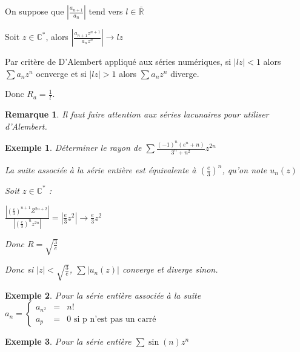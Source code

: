 \documentclass[a4paper,12pt]{book}
\newcommand{\Pre}[1]{\begin{tcolorbox}[sharp corners, colback=white,colframe=green!60!green!30!black!75, title=Preuve]#1\end{tcolorbox}}
\newtheorem{Exe}{Exemple}[section]
\newtheorem{Rem}{Remarque}[section]
\def\R{\mathbb{R}}
\def\C{\mathbb{C}}
\begin{document}
\Pre{On suppose que $\left\vert\frac{a_{n+1}}{a_n}\right\vert$ tend vers $l\in\bar{\R}$ \par Soit $z\in\C^*$, alors $\left\vert\frac{a_{n+1}z^{n+1}}{a_nz^n}\right\vert\to lz$ \par Par critère de D'Alembert appliqué aux séries numériques, si $\vert lz\vert <1$ alors $\sum a_nz^n$ ocnverge et si $\vert lz\vert>1$ alors $\sum a_nz^n$ diverge. \par Donc $R_a = \frac{1}{l}$.}
\begin{Rem}
Il faut faire attention aux séries lacunaires pour utiliser d'Alembert.
\end{Rem}
\begin{Exe}
Déterminer le rayon de $\sum\frac{(-1)^n(e^n+n)}{3^n+n^2}z^{2n}$ \par La suite associée à la série entière est équivalente à $\left(\frac{e}{3}\right)^n$, qu'on note $u_n(z)$ \par Soit $z\in\C^*$ :\par $\frac{\left\vert (\frac{e}{3})^{n+1}Z^{2n+2}\right\vert}{\left\vert(\frac{e}{3})^nz^{2n}\right\vert} = \left\vert\frac{e}{3}z^2\right\vert \to \frac{e}{3}z^2$ \par Donc $R=\sqrt{\frac{3}{e}}$ \par Donc si $\vert z\vert<\sqrt{\frac{3}{e}}$, $\sum\vert u_n(z)\vert$ converge et diverge sinon.
\end{Exe}
\begin{Exe}
Pour la série entière associée à la suite $a_n = \left\{\begin{array}{rcl} a_{n^2} & = & n! \\ a_p & = & 0 \text{ si p n'est pas un carré}\end{array}\right.$
\end{Exe}
\begin{Exe}
Pour la série entière $\sum\sin(n)z^n$
\end{Exe}
\end{document}
